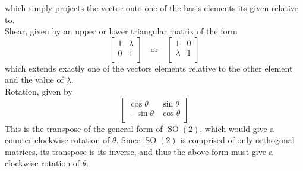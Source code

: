 which simply projects the vector onto one of the basis elements its given relative to.\\
Shear, given by an upper or lower triangular matrix of the form 
\[
    \begin{bmatrix}
        1 &\lambda    \\
         0&   1\\
    \end{bmatrix}\quad\text{or}\quad \begin{bmatrix}
        1 &   0\\
         \lambda &1   \\
    \end{bmatrix} 
\]
which extends exactly one of the vectors elements relative to the other element and the value of \(\lambda \).\\
Rotation, given by 
\[
    \begin{bmatrix}
        \cos \theta  &\sin \theta    \\
         -\sin \theta &\cos \theta    \\
    \end{bmatrix}
\]
This is the transpose of the general form of \(\operatorname{SO}(2) \), which would give a counter-clockwise rotation of \(\theta \). Since \(\operatorname{SO}(2) \) is comprised of only orthogonal matrices, its transpose is its inverse, and thus the above form must give a clockwise rotation of \(\theta \).\\